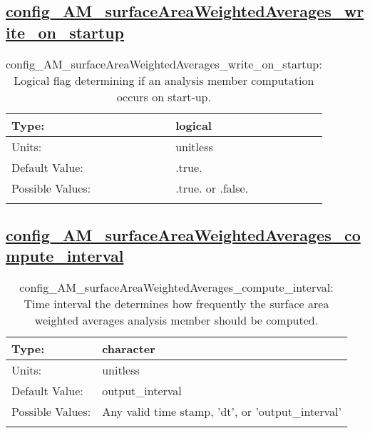 \subsection[config\_AM\_surfaceAreaWeightedAverages\_write\_on\_startup]{\hyperref[sec:nm_tab_AM_surfaceAreaWeightedAverages]{config\_AM\_surfaceAreaWeightedAverages\_write\_on\_startup}}
\label{subsec:nm_sec_config_AM_surfaceAreaWeightedAverages_write_on_startup}
\begin{center}
\begin{longtable}{| p{2.0in} || p{4.0in} |}
    \hline
    Type: & logical \\
    \hline
    Units: & \si{unitless} \\
    \hline
    Default Value: & .true. \\
    \hline
    Possible Values: & .true. or .false. \\
    \hline
    \caption{config\_AM\_surfaceAreaWeightedAverages\_write\_on\_startup: Logical flag determining if an analysis member computation occurs on start-up.}
\end{longtable}
\end{center}
\subsection[config\_AM\_surfaceAreaWeightedAverages\_compute\_interval]{\hyperref[sec:nm_tab_AM_surfaceAreaWeightedAverages]{config\_AM\_surfaceAreaWeightedAverages\_compute\_interval}}
\label{subsec:nm_sec_config_AM_surfaceAreaWeightedAverages_compute_interval}
\begin{center}
\begin{longtable}{| p{2.0in} || p{4.0in} |}
    \hline
    Type: & character \\
    \hline
    Units: & \si{unitless} \\
    \hline
    Default Value: & output\_interval \\
    \hline
    Possible Values: & Any valid time stamp, 'dt', or 'output\_interval' \\
    \hline
    \caption{config\_AM\_surfaceAreaWeightedAverages\_compute\_interval: Time interval the determines how frequently the surface area weighted averages analysis member should be computed.}
\end{longtable}
\end{center}
